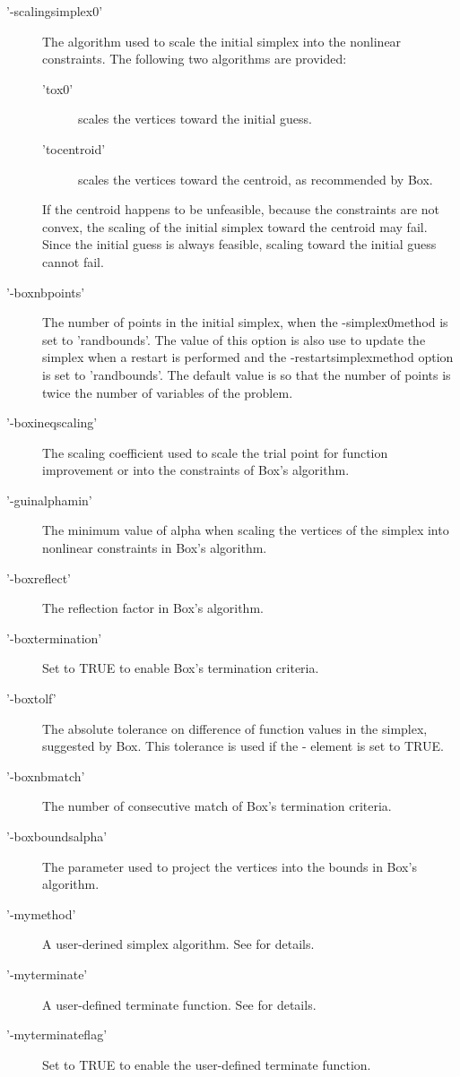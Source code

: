 \begin{Details}
\begin{description}
\begin{description}
\end{description}


\item['-scalingsimplex0'] The algorithm used to scale the initial simplex
into the nonlinear constraints. The following two algorithms are provided:
\begin{description}

\item['tox0'] scales the vertices toward the initial guess.
\item['tocentroid'] scales the vertices toward the centroid, as
recommended by Box.

\end{description}

If the centroid happens to be unfeasible, because the constraints are not
convex, the scaling of the initial simplex toward the centroid may fail.
Since the initial guess is always feasible, scaling toward the initial
guess cannot fail.
\item['-boxnbpoints'] The number of points in the initial simplex, when the
-simplex0method is set to 'randbounds'. The value of this option is also
use to update the simplex when a restart is performed and the
-restartsimplexmethod option is set to 'randbounds'. The default value is
so that the number of points is twice the number of variables of the
problem.
\item['-boxineqscaling'] The scaling coefficient used to scale the trial
point for function improvement or into the constraints of Box's
algorithm.
\item['-guinalphamin'] The minimum value of alpha when scaling the vertices
of the simplex into nonlinear constraints in Box's algorithm.
\item['-boxreflect'] The reflection factor in Box's algorithm.
\item['-boxtermination'] Set to TRUE to enable Box's termination criteria.
\item['-boxtolf'] The absolute tolerance on difference of function values in
the simplex, suggested by Box. This tolerance is used if the
- element is set to TRUE.
\item['-boxnbmatch'] The number of consecutive match of Box's termination
criteria.
\item['-boxboundsalpha'] The parameter used to project the vertices into the
bounds in Box's algorithm.
\item['-mymethod'] A user-derined simplex algorithm. See
 for details.
\item['-myterminate'] A user-defined terminate function. See
 for details.
\item['-myterminateflag'] Set to TRUE to enable the user-defined terminate
function.

\end{description}

\end{Details}
